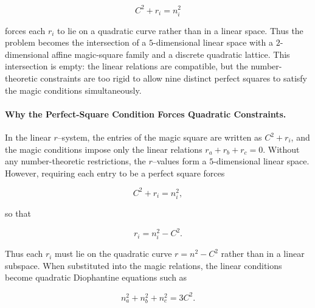 \documentclass[12pt]{article}
\begin{document}
\[
C^2 + r_i = n_i^2
\]


forces each $r_i$ to lie on a quadratic curve rather than in a linear space.
Thus the problem becomes the intersection of a $5$-dimensional linear space
with a $2$-dimensional affine magic-square family and a discrete quadratic
lattice.  This intersection is empty: the linear relations are compatible, but
the number-theoretic constraints are too rigid to allow nine distinct perfect
squares to satisfy the magic conditions simultaneously.

\paragraph{Why the Perfect-Square Condition Forces Quadratic Constraints.}
In the linear $r$--system, the entries of the magic square are written as
$C^2+r_i$, and the magic conditions impose only the linear relations
$r_a+r_b+r_c=0$.  Without any number-theoretic restrictions, the $r$--values
form a $5$-dimensional linear space.  However, requiring each entry to be a
perfect square forces


\[
C^2 + r_i = n_i^2,
\]


so that


\[
r_i = n_i^2 - C^2.
\]


Thus each $r_i$ must lie on the quadratic curve $r = n^2 - C^2$ rather than in
a linear subspace.  When substituted into the magic relations, the linear
conditions become quadratic Diophantine equations such as


\[
n_a^2 + n_b^2 + n_c^2 = 3C^2.
\]
\end{document}
